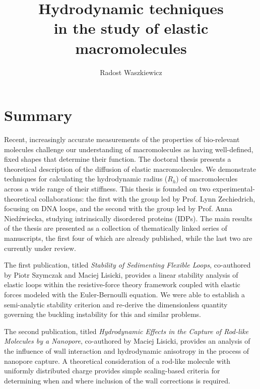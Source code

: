 \documentclass{doctoral}
\title{Hydrodynamic techniques\\in the study of elastic macromolecules}
\author{Radost Waszkiewicz}
\affiliation{University of Warsaw\\Faculty of Physics}
\begin{document}
 \maketitle 

\section*{Summary} 

Recent, increasingly accurate measurements of the properties of bio-relevant molecules challenge our understanding of macromolecules as having well-defined, fixed shapes that determine their function.
The doctoral thesis presents a theoretical description of the diffusion of elastic macromolecules.
We demonstrate techniques for calculating the hydrodynamic radius ($R_h$) of macromolecules across a wide range of their stiffness.
This thesis is founded on two experimental-theoretical collaborations: the first with the group led by Prof.
Lynn Zechiedrich, focusing on DNA loops, and the second with the group led by Prof.
Anna Niedźwiecka, studying intrinsically disordered proteins (IDPs).
The main results of the thesis are presented as a collection of thematically linked series of manuscripts, the first four of which are already published, while the last two are currently under review.

The first publication, titled \emph{Stability of Sedimenting Flexible Loops}, co-authored by Piotr Szymczak and Maciej Lisicki, provides a linear stability analysis of elastic loops within the resistive-force theory framework coupled with elastic forces modeled with the Euler-Bernoulli equation.
We were able to establish a semi-analytic stability criterion and re-derive the dimensionless quantity governing the buckling instability for this and similar problems.

The second publication, titled \emph{Hydrodynamic Effects in the Capture of Rod-like Molecules by a Nanopore}, co-authored by Maciej Lisicki, provides an analysis of the influence of wall interaction and hydrodynamic anisotropy in the process of nanopore capture.
A theoretical consideration of a rod-like molecule with uniformly distributed charge provides simple scaling-based criteria for determining when and where inclusion of the wall corrections is required.
\end{document}
